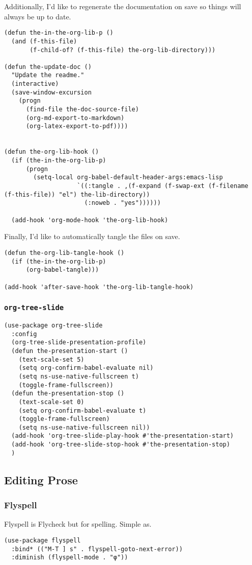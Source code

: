 \documentclass[11pt]{article}
\begin{document}
Additionally, I'd like to regenerate the documentation on save so
things will always be up to date.

\begin{verbatim}
(defun the-in-the-org-lib-p ()
  (and (f-this-file)
       (f-child-of? (f-this-file) the-org-lib-directory)))

(defun the-update-doc ()
  "Update the readme."
  (interactive)
  (save-window-excursion
    (progn
      (find-file the-doc-source-file)
      (org-md-export-to-markdown)
      (org-latex-export-to-pdf))))


(defun the-org-lib-hook ()
  (if (the-in-the-org-lib-p)
      (progn
        (setq-local org-babel-default-header-args:emacs-lisp
                    `((:tangle . ,(f-expand (f-swap-ext (f-filename (f-this-file)) "el") the-lib-directory))
                      (:noweb . "yes"))))))

  (add-hook 'org-mode-hook 'the-org-lib-hook)
\end{verbatim}

Finally, I'd like to automatically tangle the files on save.

\begin{verbatim}
(defun the-org-lib-tangle-hook ()
  (if (the-in-the-org-lib-p)
      (org-babel-tangle)))

(add-hook 'after-save-hook 'the-org-lib-tangle-hook)
\end{verbatim}
\subsubsection{\texttt{org-tree-slide}}
\label{sec:org27296ac}
\begin{verbatim}
(use-package org-tree-slide
  :config
  (org-tree-slide-presentation-profile)
  (defun the-presentation-start ()
    (text-scale-set 5)
    (setq org-confirm-babel-evaluate nil)
    (setq ns-use-native-fullscreen t)
    (toggle-frame-fullscreen))
  (defun the-presentation-stop ()
    (text-scale-set 0)
    (setq org-confirm-babel-evaluate t)
    (toggle-frame-fullscreen)
    (setq ns-use-native-fullscreen nil))
  (add-hook 'org-tree-slide-play-hook #'the-presentation-start)
  (add-hook 'org-tree-slide-stop-hook #'the-presentation-stop)
  )
\end{verbatim}
\subsection{Editing Prose}
\label{sec:org94835f2}
\subsubsection{Flyspell}
\label{sec:org74adffe}
Flyspell is Flycheck but for spelling. Simple as.
\begin{verbatim}
(use-package flyspell
  :bind* (("M-T ] s" . flyspell-goto-next-error))
  :diminish (flyspell-mode . "φ"))
\end{verbatim}
\end{document}
